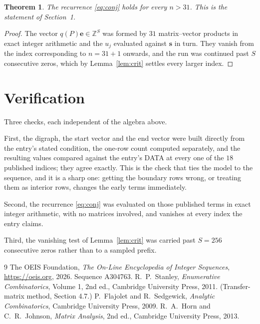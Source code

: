 \documentclass[11pt,a4paper]{article}
\theoremstyle{plain}
\newtheorem{theorem}{Theorem}
\theoremstyle{definition}
\begin{document}
\begin{theorem}
The recurrence \eqref{eq:conj} holds for every $n>31$. This is the statement of
Section~1.
\end{theorem}

\begin{proof}
The vector $q(P)\mathbf{e}\in\mathbb{Z}^{S}$ was formed by $31$ matrix--vector
products in exact integer arithmetic and the $u_j$ evaluated against $\mathbf{s}$ in turn.
They vanish from the index corresponding to $n=31+1$ onwards, and the run was continued
past $S$ consecutive zeros, which by Lemma~\ref{lem:crit} settles every larger index.
\end{proof}

\section{Verification}

Three checks, each independent of the algebra above.

First, the digraph, the start vector and the end vector were built directly from the
entry's stated condition, the one-row count computed separately, and the resulting values
compared against the entry's DATA at every one of the $18$ published indices; they
agree exactly. This is the check that ties the model to the sequence, and it is a sharp one:
getting the boundary rows wrong, or treating them as interior rows, changes the early terms
immediately.

Second, the recurrence \eqref{eq:conj} was evaluated on those published terms in exact
integer arithmetic, with no matrices involved, and vanishes at every index the entry claims.

Third, the vanishing test of Lemma~\ref{lem:crit} was carried past $S=256$ consecutive
zeros rather than to a sampled prefix.

\begin{thebibliography}{9}
 The OEIS Foundation, \emph{The On-Line Encyclopedia of Integer
Sequences}, \url{https://oeis.org}, 2026. Sequence A304763.
 R.~P.~Stanley, \emph{Enumerative Combinatorics}, Volume 1, 2nd ed.,
Cambridge University Press, 2011. (Transfer-matrix method, Section 4.7.)
 P.~Flajolet and R.~Sedgewick, \emph{Analytic Combinatorics}, Cambridge
University Press, 2009.
 R.~A.~Horn and C.~R.~Johnson, \emph{Matrix Analysis}, 2nd ed., Cambridge
University Press, 2013.
\end{thebibliography}
\end{document}
